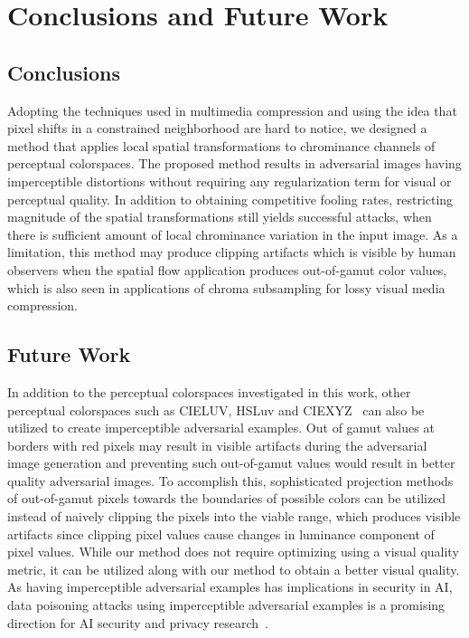 \chapter{Conclusions and Future Work}
\label{chp:6_conclusion}
\section{Conclusions}
Adopting the techniques used in multimedia compression and using the idea that pixel shifts in a constrained neighborhood are hard to notice, we designed a method that applies local spatial transformations to chrominance channels of perceptual colorspaces. The proposed method results in adversarial images having imperceptible distortions without requiring any regularization term for visual or perceptual quality. In addition to obtaining competitive fooling rates, restricting magnitude of the spatial transformations still yields successful attacks, when there is sufficient amount of local chrominance variation in the input image. As a limitation, this method may produce clipping artifacts which is visible by human observers when the spatial flow application produces out-of-gamut color values, which is also seen in applications of chroma subsampling for lossy visual media compression.


\section{Future Work}
In addition to the perceptual colorspaces investigated in this work, other perceptual colorspaces such as CIELUV, HSLuv and CIEXYZ~\cite{schanda2007colorimetry} can also be utilized to create imperceptible adversarial examples. Out of gamut values at borders with red pixels may result in visible artifacts during the adversarial image generation and preventing such out-of-gamut values would result in better quality adversarial images. To accomplish this, sophisticated projection methods of out-of-gamut pixels towards the boundaries of possible colors can be utilized instead of naively clipping the pixels into the viable range, which produces visible artifacts since clipping pixel values cause changes in luminance component of pixel values. While our method does not require optimizing using a visual quality metric, it can be utilized along with our method to obtain a better visual quality.
As having imperceptible adversarial examples has implications in security in AI, data poisoning attacks using imperceptible adversarial examples is a promising direction for AI security and privacy research~\cite{carlini2017towards,ilyas2019adversarial}.


